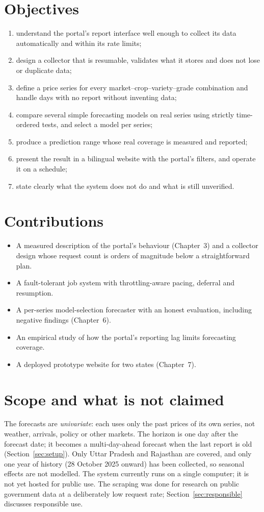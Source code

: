 \documentclass[12pt,a4paper,oneside]{report}
\numberwithin{equation}{chapter}
\numberwithin{figure}{chapter}
\numberwithin{table}{chapter}
\theoremstyle{definition}
\begin{document}
\section{Objectives}
\begin{enumerate}
  \item understand the portal's report interface well enough to collect its data automatically and within its rate limits;
  \item design a collector that is resumable, validates what it stores and does not lose or duplicate data;
  \item define a price series for every market--crop--variety--grade combination and handle days with no report without inventing data;
  \item compare several simple forecasting models on real series using strictly time-ordered tests, and select a model per series;
  \item produce a prediction range whose real coverage is measured and reported;
  \item present the result in a bilingual website with the portal's filters, and operate it on a schedule;
  \item state clearly what the system does not do and what is still unverified.
\end{enumerate}

\section{Contributions}
\begin{itemize}
  \item A measured description of the portal's behaviour (Chapter~3) and a collector design whose request count is orders of magnitude below a straightforward plan.
  \item A fault-tolerant job system with throttling-aware pacing, deferral and resumption.
  \item A per-series model-selection forecaster with an honest evaluation, including negative findings (Chapter~6).
  \item An empirical study of how the portal's reporting lag limits forecasting coverage.
  \item A deployed prototype website for two states (Chapter~7).
\end{itemize}

\section{Scope and what is not claimed}
The forecasts are \emph{univariate}: each uses only the past prices of its own series, not weather, arrivals, policy or other markets. The horizon is one day after the forecast date; it becomes a multi-day-ahead forecast when the last report is old (Section~\ref{sec:setup}). Only Uttar Pradesh and Rajasthan are covered, and only one year of history (28 October 2025 onward) has been collected, so seasonal effects are not modelled. The system currently runs on a single computer; it is not yet hosted for public use. The scraping was done for research on public government data at a deliberately low request rate; Section~\ref{sec:responsible} discusses responsible use.
\end{document}
